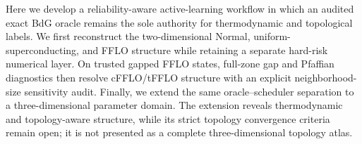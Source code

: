 Here we develop a reliability-aware active-learning workflow in which an audited exact BdG oracle remains the sole authority for thermodynamic and topological labels. We first reconstruct the two-dimensional Normal, uniform-superconducting, and FFLO structure while retaining a separate hard-risk numerical layer. On trusted gapped FFLO states, full-zone gap and Pfaffian diagnostics then resolve cFFLO/tFFLO structure with an explicit neighborhood-size sensitivity audit. Finally, we extend the same oracle--scheduler separation to a three-dimensional parameter domain. The extension reveals thermodynamic and topology-aware structure, while its strict topology convergence criteria remain open; it is not presented as a complete three-dimensional topology atlas.
